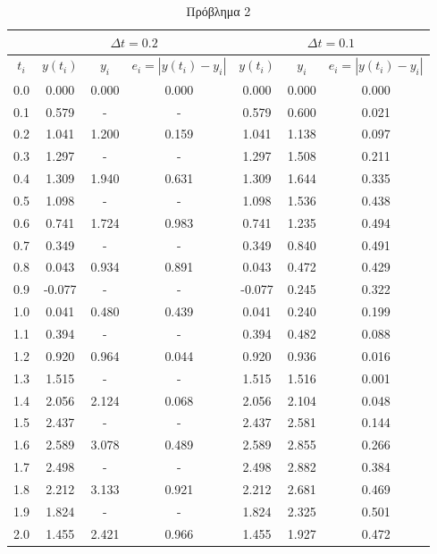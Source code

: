 \documentclass{article}
\newcommand{\en}[1]{\foreignlanguage{english}{#1}}
\begin{document}
\begin{table}
    \centering
    \begin{tabular}{|c|c|c|c|c|c|c|}

    \hline 
     & \multicolumn{3}{|c|}{\en{$\Delta t = 0.2$}} & \multicolumn{3}{|c|}{\en{$\Delta t = 0.1$}} \\

    \hline
    \en{$t_i$} & \en{$y(t_i)$} & \en{$y_i$} & \en{$e_i = | y(t_i) - y_i |$} & \en{$y(t_i)$} & \en{$y_i$} & \en{$e_i = | y(t_i) - y_i |$} \\

    \hline
    0.0 & 0.000  & 0.000 & 0.000 & 0.000  & 0.000 & 0.000 \\
    0.1 & 0.579  & -     & -     & 0.579  & 0.600 & 0.021 \\
    0.2 & 1.041  & 1.200 & 0.159 & 1.041  & 1.138 & 0.097 \\
    0.3 & 1.297  & -     & -     & 1.297  & 1.508 & 0.211 \\
    0.4 & 1.309  & 1.940 & 0.631 & 1.309  & 1.644 & 0.335 \\
    0.5 & 1.098  & -     & -     & 1.098  & 1.536 & 0.438 \\
    0.6 & 0.741  & 1.724 & 0.983 & 0.741  & 1.235 & 0.494 \\
    0.7 & 0.349  & -     & -     & 0.349  & 0.840 & 0.491 \\
    0.8 & 0.043  & 0.934 & 0.891 & 0.043  & 0.472 & 0.429 \\
    0.9 & -0.077 & -     & -     & -0.077 & 0.245 & 0.322 \\
    1.0 & 0.041  & 0.480 & 0.439 & 0.041  & 0.240 & 0.199 \\
    1.1 & 0.394  & -     & -     & 0.394  & 0.482 & 0.088 \\
    1.2 & 0.920  & 0.964 & 0.044 & 0.920  & 0.936 & 0.016 \\
    1.3 & 1.515  & -     & -     & 1.515  & 1.516 & 0.001 \\
    1.4 & 2.056  & 2.124 & 0.068 & 2.056  & 2.104 & 0.048 \\
    1.5 & 2.437  & -     & -     & 2.437  & 2.581 & 0.144 \\
    1.6 & 2.589  & 3.078 & 0.489 & 2.589  & 2.855 & 0.266 \\
    1.7 & 2.498  & -     & -     & 2.498  & 2.882 & 0.384 \\
    1.8 & 2.212  & 3.133 & 0.921 & 2.212  & 2.681 & 0.469 \\
    1.9 & 1.824  & -     & -     & 1.824  & 2.325 & 0.501 \\
    2.0 & 1.455  & 2.421 & 0.966 & 1.455  & 1.927 & 0.472 \\
    \hline

    \end{tabular}
    \caption{Πρόβλημα 2}
\end{table}
\end{document}
